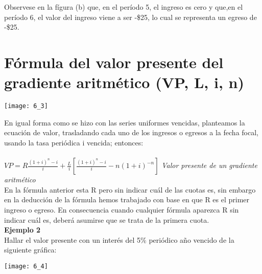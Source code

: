 Observese en la fígura (b) que, en el período 5, el ingreso es cero y que,en el período 6, el valor del ingreso viene a ser -\$25, lo cual se representa un egreso de -\$25.

\section{Fórmula del valor presente del gradiente aritmético (VP, L, i, n)}
\begin{center}
	\texttt{[image: 6\_3]}
\end{center}
En igual forma como se hizo con las series uniformes vencidas, planteamos la ecuación de valor, trasladando cada uno de los ingresos o egresos a la fecha focal, usando la tasa periódica i vencida; entonces:\\\\
$VP=R\frac{(1+i)^n-i}{i}+\frac{L}{i}[\frac{(1+i)^n-i}{i}-n(1+i)^{-n}]$\hspace{35 pt} \textit{Valor presente de un gradiente aritmético}\\
	
	En la fórmula anterior esta R pero sin indicar cuál de las cuotas es, sin embargo en la deducción de la fórmula hemos trabajado con base en que R es el primer ingreso o egreso. En consecuencia cuando cualquier fórmula aparezca R sin indicar cuál es, deberá asumirse que se trata de la primera cuota.\\
	
	\textbf{Ejemplo 2}\\
	Hallar el valor presente con un interés del 5\% periódico año vencido de la siguiente gráfica:\\
	
	\begin{center}
		\texttt{[image: 6\_4]}
	\end{center}
	
